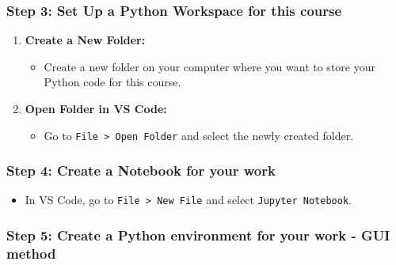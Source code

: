 \documentclass[
  letterpaper,
  DIV=11,
  numbers=noendperiod]{scrreprt}
\providecommand{\tightlist}{%
  \setlength{\itemsep}{0pt}\setlength{\parskip}{0pt}}\usepackage{longtable,booktabs,array}
\begin{document}
\hypertarget{step-3-set-up-a-python-workspace-for-this-course}{%
\subsubsection{Step 3: Set Up a Python Workspace for this
course}\label{step-3-set-up-a-python-workspace-for-this-course}}

\begin{enumerate}
\def\labelenumi{\arabic{enumi}.}
\tightlist
\item
  \textbf{Create a New Folder:}

  \begin{itemize}
  \tightlist
  \item
    Create a new folder on your computer where you want to store your
    Python code for this course.
  \end{itemize}
\item
  \textbf{Open Folder in VS Code:}

  \begin{itemize}
  \tightlist
  \item
    Go to \texttt{File\ \textgreater{}\ Open\ Folder} and select the
    newly created folder.
  \end{itemize}
\end{enumerate}

\hypertarget{step-4-create-a-notebook-for-your-work}{%
\subsubsection{Step 4: Create a Notebook for your
work}\label{step-4-create-a-notebook-for-your-work}}

\begin{itemize}
\tightlist
\item
  In VS Code, go to \texttt{File\ \textgreater{}\ New\ File} and select
  \texttt{Jupyter\ Notebook}.
\end{itemize}

\hypertarget{step-5-create-a-python-environment-for-your-work---gui-method}{%
\subsubsection{Step 5: Create a Python environment for your work - GUI
method}\label{step-5-create-a-python-environment-for-your-work---gui-method}}
\end{document}

